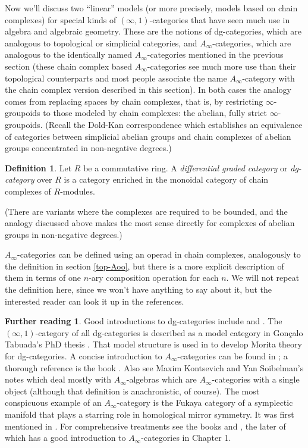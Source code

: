 \documentclass[12pt]{amsart}
\theoremstyle{definition} \newtheorem{definition}[theorem]{Definition}
\newtheorem*{further}{Further reading}
\numberwithin{equation}{section}
\newcommand{\oo}{\infty}
\newcommand{\io}{$(\oo,1)$}
\begin{document}
Now we'll discuss two ``linear'' models (or more precisely, models
based on chain complexes) for special kinds of \io-categories that
have seen much use in algebra and algebraic geometry. These are the
notions of dg-categories, which are analogous to topological or
simplicial categories, and $A_\oo$-categories, which are analogous to
the identically named $A_\oo$-categories mentioned in the previous
section (these chain complex based $A_\oo$-categories see much more
use than their topological counterparts and most people associate the
name $A_\oo$-category with the chain complex version described in this
section). In both cases the analogy comes from replacing spaces by
chain complexes, that is, by restricting $\oo$-groupoids to those
modeled by chain complexes: the abelian, fully strict $\oo$-groupoids.
(Recall the Dold-Kan correspondence which establishes an equivalence
of categories between simplicial abelian groups and chain complexes of
abelian groups concentrated in non-negative degrees.)

\begin{definition} Let $R$ be a commutative ring. A \emph{differential
graded category} or \emph{dg-category} over $R$ is a category enriched
in the monoidal category of chain complexes of $R$-modules.
\end{definition}

(There are variants where the complexes are required to be bounded,
and the analogy discussed above makes the most sense directly for
complexes of abelian groups in non-negative degrees.)

$A_\oo$-categories can be defined using an operad in chain complexes,
analogously to the definition in section \ref{top-Aoo}, but there is a
more explicit description of them in terms of one $n$-ary composition
operation for each $n$. We will not repeat the definition here, since
we won't have anything to say about it, but the interested reader can
look it up in the references.

\begin{further} Good introductions to dg-categories include
\cite{Keller} and \cite{ToenDG}. The \io-category of all dg-categories
is described as a model category in Gon\c{c}alo Tabuada's PhD thesis
\cite{Tabuada}. That model structure is used in \cite{ToenMorita}
to develop Morita theory for dg-categories.
A concise introduction to $A_\oo$-categories can be
found in \cite{Keller}; a thorough reference is the book
\cite{Bespalov}. Also see Maxim Kontsevich and Yan Soibelman's notes
\cite{KontsevichSoibelman} which deal mostly with $A_\oo$-algebras
which are $A_\oo$-categories with a single object (although that
definition is anachronistic, of course). The most conspicuous example
of an $A_\oo$-category is the Fukaya category of a symplectic manifold
that plays a starring role in homological mirror symmetry. It was
first mentioned in \cite{Fukaya}. For comprehensive treatments see the
books \cite{FOOO} and \cite{Seidel}, the later of which has a good
introduction to $A_\oo$-categories in Chapter 1. \end{further}
\end{document}
